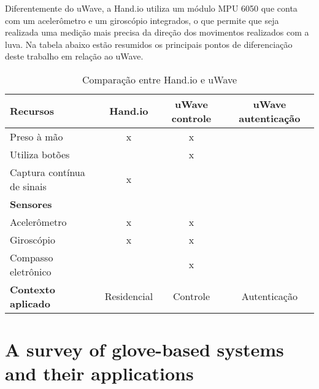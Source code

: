 Diferentemente do uWave, a Hand.io utiliza um módulo MPU 6050 que conta com um acelerômetro e um giroscópio integrados, o que permite que seja realizada uma medição mais precisa da direção dos movimentos realizados com a luva. Na tabela abaixo estão resumidos os principais pontos de diferenciação deste trabalho em relação ao uWave.

\begin{table}[ht]
	\centering
    \caption{Comparação entre Hand.io e uWave}
    \label{tab:comp_uwave}
	\begin{tabular}{|l|c|c|c|}
    	\hline
		\textbf{Recursos} & \textbf{Hand.io} & \textbf{uWave controle} & \textbf{uWave autenticação} \\
        \hline
        \hline
        Preso à mão & x & x & \\
        \hline
        Utiliza botões &  & x & \\
        \hline
        Captura contínua de sinais & x & & \\
        \hline
        \hline
        \textbf{Sensores} & & & \\
        \hline
        \hline
        Acelerômetro & x & x & \\
        \hline
        Giroscópio & x & x & \\
        \hline
        Compasso eletrônico & & x & \\
        \hline
        \hline
        \textbf{Contexto aplicado} & Residencial & Controle & Autenticação\\
        \hline
	\end{tabular}

\end{table}



\section{A survey of glove-based systems and their applications}

\cite{survey:2008}





